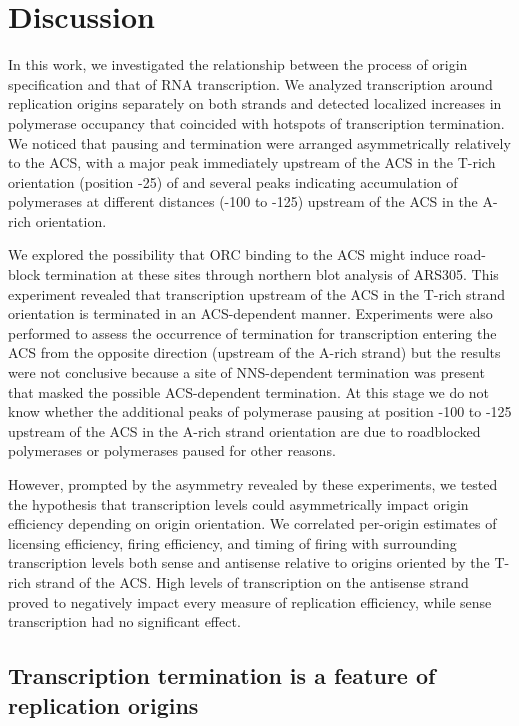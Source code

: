 \section{Discussion}

In this work, we investigated the relationship between the process of origin specification and that of RNA transcription. We analyzed transcription around replication origins separately on both strands and detected localized increases in polymerase occupancy that coincided with hotspots of transcription termination. We noticed that pausing and termination were arranged asymmetrically relatively to the ACS, with a major peak immediately upstream of the ACS in the T-rich orientation (position -25) of and several peaks indicating accumulation of polymerases at different distances (-100 to -125) upstream of the ACS in the  A-rich  orientation.

We explored the possibility that ORC binding to the ACS might induce road-block termination at these sites through northern blot analysis of ARS305. This experiment revealed that transcription upstream of the ACS in the T-rich strand orientation is terminated in an ACS-dependent manner. Experiments were also performed to assess the occurrence of termination for transcription entering the ACS from the opposite direction (upstream of the A-rich strand) but the results were not conclusive because a site of NNS-dependent termination was present that masked the possible ACS-dependent termination. At this stage we do not know whether the additional peaks of polymerase pausing at position -100 to -125 upstream of the ACS in the A-rich strand orientation are due to roadblocked polymerases or polymerases paused for other reasons.  

However, prompted by the asymmetry revealed by these experiments, we tested the hypothesis that transcription levels could asymmetrically impact origin efficiency depending on origin orientation. We correlated per-origin estimates of licensing efficiency, firing efficiency, and timing of firing with surrounding transcription levels both sense and antisense relative to origins oriented by the T-rich strand of the ACS. High levels of transcription on the antisense strand proved to negatively impact every measure of replication efficiency, while sense transcription had no significant effect.

\subsection{Transcription termination is a feature of replication origins}

